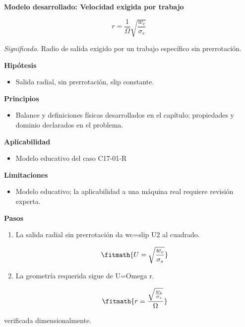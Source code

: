 \documentclass[10pt,openany]{book}
\begin{document}
\begin{tcolorbox}[title={Desarrollos del modelo}, studiumdef, breakable]

\noindent\textbf{Modelo desarrollado: Velocidad exigida por trabajo}

\begin{equation}
r=\frac{1}{\Omega}\sqrt{\frac{w_c}{\sigma_s}}
\label{eq:EC-C17}
\end{equation}

\noindent\textit{Significado.} Radio de salida exigido por un trabajo específico sin prerrotación.

\noindent\textbf{Hipótesis}
\begin{itemize}
\item Salida radial, sin prerrotación, slip constante.
\end{itemize}

\noindent\textbf{Principios}
\begin{itemize}
\item Balance y definiciones físicas desarrollados en el capítulo; propiedades y dominio declarados en el problema.
\end{itemize}

\noindent\textbf{Aplicabilidad}
\begin{itemize}
\item Modelo educativo del caso C17-01-R
\end{itemize}

\noindent\textbf{Limitaciones}
\begin{itemize}
\item Modelo educativo; la aplicabilidad a una máquina real requiere revisión experta.
\end{itemize}

\noindent\textbf{Pasos}
\begin{enumerate}
\item
La salida radial sin prerrotación da wc=slip U2 al cuadrado.

\[
\fitmath{U=\sqrt{\frac{w_c}{\sigma_s}}}
\]
\item
La geometría requerida sigue de U=Omega r.

\[
\fitmath{r=\frac{\sqrt{\frac{w_c}{\sigma_s}}}{\Omega}}
\]
\end{enumerate}

{\noindent\footnotesize verificada dimensionalmente.\par}
\end{tcolorbox}
\end{document}
